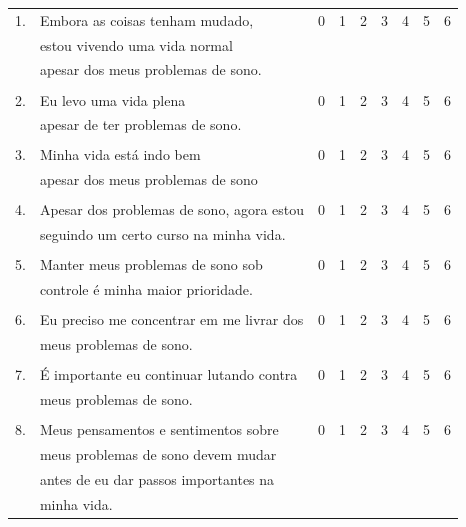 \documentclass[
  ,doc,11pt, twoside,floatsintext]{apa6}
\begin{document}
\begin{appendix}
\begin{table}[h]
\centering
\begin{tabular}{lllllllll}
1. & Embora as coisas tenham mudado,           & 0 & 1 & 2 & 3 & 4 & 5 & 6 \\
   & estou vivendo uma vida normal             &   &   &   &   &   &   &   \\
   & apesar dos meus problemas de sono.        &   &   &   &   &   &   &   \\
   &                                           &   &   &   &   &   &   &   \\
2. & Eu levo uma vida plena                    & 0 & 1 & 2 & 3 & 4 & 5 & 6 \\
   & apesar de ter problemas de sono.          &   &   &   &   &   &   &   \\
   &                                           &   &   &   &   &   &   &   \\
3. & Minha vida está indo bem                  & 0 & 1 & 2 & 3 & 4 & 5 & 6 \\
   & apesar dos meus problemas de sono         &   &   &   &   &   &   &   \\
   &                                           &   &   &   &   &   &   &   \\
4. & Apesar dos problemas de sono, agora estou & 0 & 1 & 2 & 3 & 4 & 5 & 6 \\
   & seguindo um certo curso na minha vida.    &   &   &   &   &   &   &   \\
   &                                           &   &   &   &   &   &   &   \\
5. & Manter meus problemas de sono sob         & 0 & 1 & 2 & 3 & 4 & 5 & 6 \\
   & controle é minha maior prioridade.        &   &   &   &   &   &   &   \\
   &                                           &   &   &   &   &   &   &   \\
6. & Eu preciso me concentrar em me livrar dos & 0 & 1 & 2 & 3 & 4 & 5 & 6 \\
   & meus problemas de sono.                   &   &   &   &   &   &   &   \\
   &                                           &   &   &   &   &   &   &   \\
7. & É importante eu continuar lutando contra  & 0 & 1 & 2 & 3 & 4 & 5 & 6 \\
   & meus problemas de sono.                   &   &   &   &   &   &   &   \\
   &                                           &   &   &   &   &   &   &   \\
8. & Meus pensamentos e sentimentos sobre      & 0 & 1 & 2 & 3 & 4 & 5 & 6 \\
   & meus problemas de sono devem mudar        &   &   &   &   &   &   &   \\
   & antes de eu dar passos importantes na     &   &   &   &   &   &   &   \\
   & minha vida.                               &   &   &   &   &   &   &  
\end{tabular}
\end{table}


\end{appendix}
\end{document}
